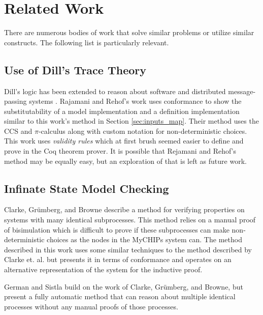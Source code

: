 \documentclass[runningheads]{llncs}
\newcommand{\secref}[1]{Section \ref{#1}}
\newif\ifcomments
\newif\ifkylecomments
\newcommand{\egm}[1]{\ifcomments\textcolor{orange}{egm: #1}\fi}
\newcommand{\krs}[1]{\ifkylecomments\textcolor{blue}{krs: #1}\fi}
\begin{document}
\section{Related Work}
\label{sec:related_work}
\krs{Think this is enough related work?
\egm{Flesh it out and make it complete ASAP. We are just about to the point where we send it to Kimball}}


There are numerous bodies of work that solve similar problems or utilize similar constructs. The following list is particularly relevant. 


\subsection{Use of Dill's Trace Theory}
Dill's logic has been extended to reason about software and distributed message-passing systems \cite{message_passing_conformance} \cite{conformance_example}. Rajamani and Rehof's work uses conformance to show the substitutability of a model implementation and a definition implementation similar to this work's method in \secref{sec:inputs_map}. Their method uses the CCS and $\pi$-calculus along with custom notation for non-deterministic choices. This work uses \emph{validity rules} which at first brush seemed easier to define and prove in the Coq theorem prover. It is possible that Rejamani and Rehof's method may be equally easy, but an exploration of that is left as future work.
\krs{I asked if Dill really was used in software often. I moved it here to related work. And found a reference and it's really cool stuff. Keep finding stuff I wish I knew about before...\egm{I would remove it because it doesn't add anything interesting to the discussion.}}

\subsection{Infinate State Model Checking}
Clarke, Grümberg, and Browne describe a method for verifying properties on systems with many identical subprocesses. This method relies on a manual proof of bisimulation which is difficult to prove if these subprocesses can make non-deterministic choices as the nodes in the MyCHIPs system can. The method described in this work uses some similar techniques to the method described by Clarke et. al. but presents it in terms of conformance and operates on an alternative representation of the system for the inductive proof.

German and Sistla build on the work of Clarke, Grümberg, and Browne, but present a fully automatic method that can reason about multiple identical processes without any manual proofs of those processes. 
\end{document}
